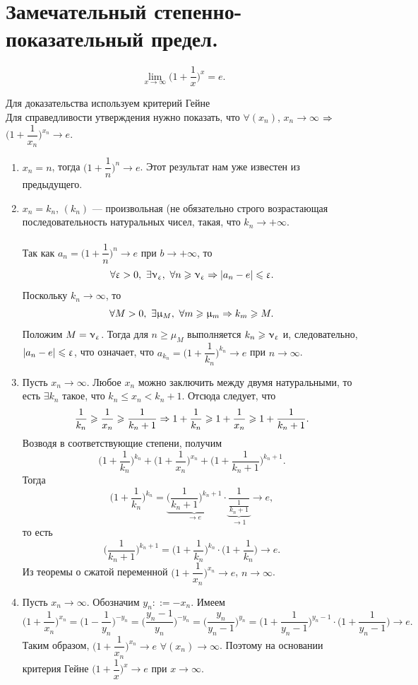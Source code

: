 \section{Замечательный степенно-показательный предел.}
$$\lim\limits_{x\to\infty}\Big(1+\dfrac{1}{x}\Big)^x=e.$$
\begin{Proof}
	Для доказательства используем критерий Гейне\\
	Для справедливости утверждения нужно показать, что $\forall(x_n)$, $x_n\to\infty$ $\Rightarrow$ $\Big(1+\dfrac{1}{x_n}\Big)^{x_n}\to e$.
	\begin{enumerate}
		\item $x_n = n$, тогда $\Big(1+\dfrac{1}{n}\Big)^n\to e$. Этот результат нам уже известен из предыдущего.
		\item $x_n = k_n$, $(k_n)$ --- произвольная (не обязательно строго возрастающая последовательность натуральных чисел,  такая, что $k_n\to+\infty$.\\\\
		Так как $a_n = \Big(1+\dfrac{1}{n}\Big)^n \to e$ при $b \to +\infty$, то $$\forall \epsilon > 0,\ \exists\nu_\epsilon,\ \fa n \geqslant \nu_\epsilon \Ra |a_n - e | \leqslant \varepsilon.$$
		Поскольку $k_n \to \infty$, то 
		$$\forall M > 0,\ \exists \upmu_M,\ \forall m \geqslant \upmu_m\Rightarrow k_m \geqslant M.$$
		Положим $M = \upnu_\upvarepsilon$. Тогда для $n \ge \mu_M$ выполняется $k_n \geqslant \upnu_\upvarepsilon$ и, следовательно, $|a_n - e|\leqslant \upvarepsilon$, что означает, что $a_{k_n} =\Big(1+\dfrac{1}{k_n}\Big)^{k_n} \to e $ при $n \to \infty$.
		\item Пусть $x_n \to \infty$. Любое $x_n$ можно заключить между двумя натуральными, то есть $\exists k_n$ такое, что $k_n \leq x_n < k_n+1$. Отсюда следует, что $$\dfrac{1}{k_n}\geqslant \dfrac{1}{x_n}\geqslant \dfrac{1}{k_n + 1}\Rightarrow 1 + \dfrac{1}{k_n} \geqslant 1 + \dfrac{1}{x_n} \geqslant 1 + \dfrac{1}{k_n + 1}.$$
		Возводя в соответствующие степени, получим
		$$\Big(1 + \dfrac{1}{k_n}\Big)^{k_n} + \Big(1+ \dfrac{1}{x_n}\Big)^{x_n} + \Big(1+\dfrac{1}{k_n + 1}\Big)^{k_n + 1}.$$
		Тогда $$\Big(1 + \dfrac{1}{k_n} \Big)^{k_n} =\underbrace{\Big(\dfrac{1}{k_n + 1}\Big)^{k_n + 1}}_{\to e}\cdot\underbrace{ \dfrac{1}{\frac{1}{k_n + 1}}}_{\to 1}\rightarrow e,$$
		то есть $$\Big(\dfrac{1}{k_n + 1}\Big)^{k_n + 1} = \Big(1 + \dfrac{1}{k_n} \Big)^{k_n}\cdot \Big(1 + \dfrac{1}{k_n} \Big)\rightarrow e.$$
		Из теоремы о сжатой переменной $\Big(1+\dfrac{1}{x_n}\Big)^{x_n}\to e$, $n \to \infty$.
		\item Пусть $x_n \to \infty$. Обозначим $y_n ::= -x_n$. Имеем $$\Big(1+\dfrac{1}{x_n}\Big)^{x_n} = \Big(1-\dfrac{1}{y_n}\Big)^{-y_n} = \Big(\dfrac{y_n - 1}{y_n}\Big)^{-y_n} = \Big(\dfrac{y_n}{y_n - 1}\Big)^{y_n} = \Big(1 + \dfrac{1}{y_n - 1}\Big)^{y_n - 1}\cdot \Big(1 + \dfrac{1}{y_n - 1}\Big) \rightarrow e.$$
		Таким образом, $\Big(1+\dfrac{1}{x_n}\Big)^{x_n}\rightarrow e$ $\forall (x_n)\rightarrow \infty$. Поэтому на основании критерия Гейне $\Big(1+\dfrac{1}{x}\Big)^{x}\rightarrow e$ при $x \to \infty$.
	\end{enumerate}
\end{Proof}
